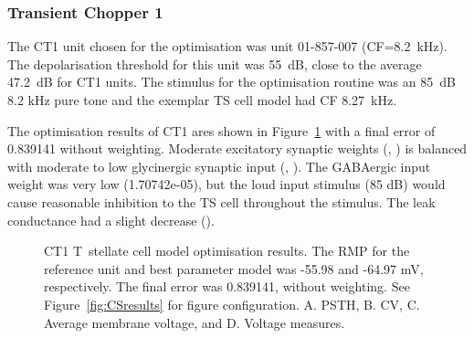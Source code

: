 
\clearpage
\subsubsection{Transient Chopper 1}

The CT1 unit chosen for the optimisation was unit 01-857-007 \citep{PaoliniClareyEtAl:2005} (CF=8.2~kHz).  
The depolarisation threshold for this unit was 55~dB, close to the average 47.2~dB for CT1 units. 
The stimulus for the optimisation routine was an 85~dB 8.2 kHz pure tone and the exemplar TS cell model had CF 8.27~kHz.
 
The optimisation results of CT1 ares shown in Figure~\ref{fig:CT1results} with a final error of 0.839141 without weighting.   
Moderate excitatory synaptic weights (, ) is balanced with moderate to low glycinergic synaptic input (, ). 
The GABAergic input weight was very low (\wGLGTS 1.70742e-05), but the loud input stimulus (85 dB) would cause reasonable inhibition to the TS cell throughout the stimulus.  
The leak conductance had a slight decrease ().


\begin{figure}[htb]
  \centering
  \caption[CT1 T~stellate Optimisation results]{CT1 T~stellate cell model     optimisation results. 
The RMP for the reference unit and best parameter     model was -55.98 and -64.97 mV, respectively. 
The final error was 0.839141,     without weighting. 
See Figure~\ref{fig:CSresults} for figure configuration.
A. PSTH, B. CV, C. Average membrane voltage, and D. Voltage measures.}
  \label{fig:CT1results}
\end{figure}

